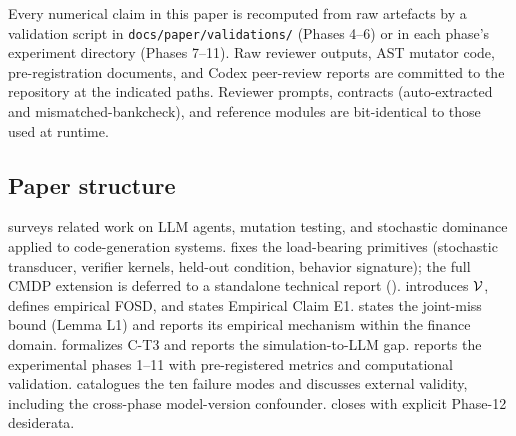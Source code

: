 Every numerical claim in this paper is recomputed from raw artefacts by a validation script in \texttt{docs/paper/validations/} (Phases 4--6) or in each phase's experiment directory (Phases 7--11). Raw reviewer outputs, AST mutator code, pre-registration documents, and Codex peer-review reports are committed to the repository at the indicated paths. Reviewer prompts, contracts (auto-extracted and mismatched-bankcheck), and reference modules are bit-identical to those used at runtime.

\subsection{Paper structure}

 surveys related work on LLM agents, mutation testing, and stochastic dominance applied to code-generation systems.  fixes the load-bearing primitives (stochastic transducer, verifier kernels, held-out condition, behavior signature); the full CMDP extension is deferred to a standalone technical report ().  introduces $\mathcal{V}$, defines empirical FOSD, and states Empirical Claim E1.  states the joint-miss bound (Lemma L1) and reports its empirical mechanism within the finance domain.  formalizes C-T3 and reports the simulation-to-LLM gap.  reports the experimental phases 1--11 with pre-registered metrics and computational validation.  catalogues the ten failure modes and discusses external validity, including the cross-phase model-version confounder.  closes with explicit Phase-12 desiderata.
